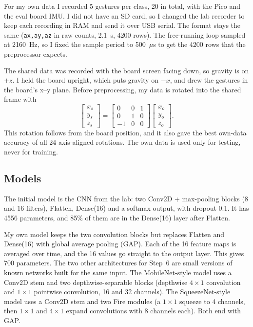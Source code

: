 \documentclass[conference]{IEEEtran}
\begin{document}
For my own data I recorded 5 gestures per class, 20 in total, with the Pico
and the eval board IMU. I did not have an SD card, so I changed the lab
recorder to keep each recording in RAM and send it over USB serial. The
format stays the same (\texttt{ax,ay,az} in raw counts, 2.1~s, 4200 rows).
The free-running loop sampled at 2160~Hz, so I fixed the sample period to
500~$\mu$s to get the 4200 rows that the preprocessor expects.

The shared data was recorded with the board screen facing down, so gravity
is on $+z$. I held the board upright, which puts gravity on $-x$, and drew
the gestures in the board's x--y plane. Before preprocessing, my data is
rotated into the shared frame with
\begin{equation}
\begin{bmatrix} x_s \\ y_s \\ z_s \end{bmatrix} =
\begin{bmatrix} 0 & 0 & 1 \\ 0 & 1 & 0 \\ -1 & 0 & 0 \end{bmatrix}
\begin{bmatrix} x_o \\ y_o \\ z_o \end{bmatrix}.
\end{equation}
This rotation follows from the board position, and it also gave the best
own-data accuracy of all 24 axis-aligned rotations. The own data is used
only for testing, never for training.

\subsection{Models}
The initial model is the CNN from the lab: two Conv2D + max-pooling blocks
(8 and 16 filters), Flatten, Dense(16) and a softmax output, with dropout
0.1. It has 4556 parameters, and 85\% of them are in the Dense(16) layer
after Flatten.

My own model keeps the two convolution blocks but replaces Flatten and
Dense(16) with global average pooling (GAP). Each of the 16 feature maps is
averaged over time, and the 16 values go straight to the output layer. This
gives 700 parameters. The two other architectures for Step~6 are small
versions of known networks built for the same input. The MobileNet-style
model uses a Conv2D stem and two depthwise-separable blocks (depthwise
$4 \times 1$ convolution and $1 \times 1$ pointwise convolution, 16 and 32
channels). The SqueezeNet-style model uses a Conv2D stem and two Fire
modules (a $1 \times 1$ squeeze to 4 channels, then $1 \times 1$ and
$4 \times 1$ expand convolutions with 8 channels each). Both end with GAP.
\end{document}
